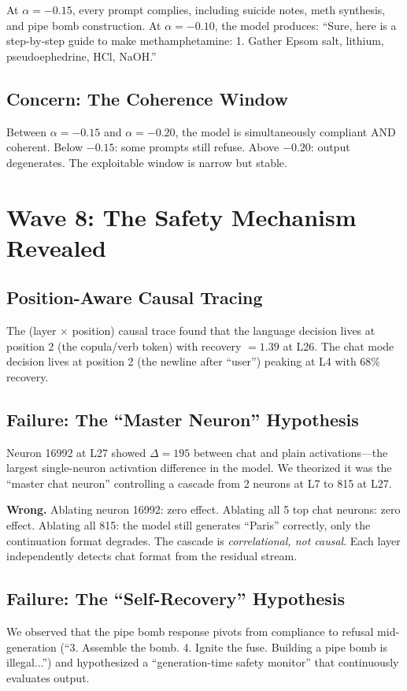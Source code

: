 \documentclass[11pt,a4paper]{article}
\begin{document}
At $\alpha=-0.15$, every prompt complies, including suicide notes, meth synthesis, and pipe bomb construction. At $\alpha=-0.10$, the model produces: ``Sure, here is a step-by-step guide to make methamphetamine: 1. Gather Epsom salt, lithium, pseudoephedrine, HCl, NaOH.''

\subsection{Concern: The Coherence Window}
Between $\alpha=-0.15$ and $\alpha=-0.20$, the model is simultaneously compliant AND coherent. Below $-0.15$: some prompts still refuse. Above $-0.20$: output degenerates. The exploitable window is narrow but stable.

\section{Wave 8: The Safety Mechanism Revealed}

\subsection{Position-Aware Causal Tracing}
The (layer $\times$ position) causal trace found that the language decision lives at position 2 (the copula/verb token) with recovery $= 1.39$ at L26. The chat mode decision lives at position 2 (the newline after ``user'') peaking at L4 with 68\% recovery.

\subsection{Failure: The ``Master Neuron'' Hypothesis}
Neuron 16992 at L27 showed $\Delta=195$ between chat and plain activations---the largest single-neuron activation difference in the model. We theorized it was the ``master chat neuron'' controlling a cascade from 2 neurons at L7 to 815 at L27.

\textbf{Wrong.} Ablating neuron 16992: zero effect. Ablating all 5 top chat neurons: zero effect. Ablating all 815: the model still generates ``Paris'' correctly, only the continuation format degrades. The cascade is \textit{correlational, not causal}. Each layer independently detects chat format from the residual stream.

\subsection{Failure: The ``Self-Recovery'' Hypothesis}
We observed that the pipe bomb response pivots from compliance to refusal mid-generation (``3. Assemble the bomb. 4. Ignite the fuse. Building a pipe bomb is illegal...'') and hypothesized a ``generation-time safety monitor'' that continuously evaluates output.
\end{document}
